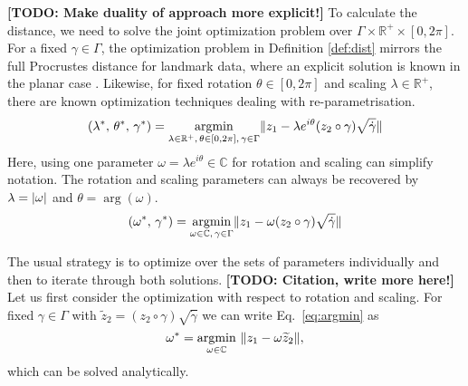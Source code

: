 \textbf{[TODO: Make duality of approach more explicit!]}
To calculate the distance, we need to solve the joint optimization problem over $\Gamma \times \mathbb{R}^+ \times [0,2\pi]$.
For a fixed $\gamma \in \Gamma$, the optimization problem in Definition \ref{def:dist} mirrors the full Procrustes distance for landmark data, where an explicit solution is known in the planar case \parencite[see][Chapter~8]{DrydenMardia2016}.
Likewise, for fixed rotation $\theta \in [0,2\pi]$ and scaling $\lambda \in \mathbb{R}^+$, there are known optimization techniques dealing with re-parametrisation.
\begin{equation*}
  (\lambda^*,\, \theta^*,\, \gamma^*) = \operatorname*{argmin}_{\lambda \in \mathbb{R}^+,\, \theta \in [0,2\pi],\, \gamma \in \Gamma} \lVert z_1 - \lambda e^{i\theta} (z_2 \circ \gamma) \sqrt{\dot\gamma}\rVert
\end{equation*}
Here, using one parameter $\omega = \lambda e^{i\theta} \in \mathbb{C}$ for rotation and scaling can simplify notation.
The rotation and scaling parameters can always be recovered by $\lambda = \lvert\omega\rvert$ and $\theta = \arg(\omega)$.
\begin{equation}
  \label{eq:argmin}
  (\omega^*,\, \gamma^*) = \operatorname*{argmin}_{\omega \in \mathbb{C},\, \gamma \in \Gamma} \lVert z_1 - \omega (z_2 \circ \gamma) \sqrt{\dot\gamma}\rVert
\end{equation}

The usual strategy is to optimize over the sets of parameters individually and then to iterate through both solutions.
\textbf{[TODO: Citation, write more here!]}
Let us first consider the optimization with respect to rotation and scaling.
For fixed $\gamma \in \Gamma$ with $\widetilde z_2 = (z_2 \circ \gamma) \sqrt{\dot\gamma}$ we can write Eq.\ \ref{eq:argmin} as
\begin{equation}
  \label{eq:argmin_rot}
  \omega^* = \operatorname*{argmin}_{\omega \in \mathbb{C}}\,\, \lVert z_1 - \omega \widetilde z_2\rVert,
\end{equation}
which can be solved analytically.

